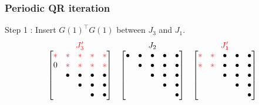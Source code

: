  \begin{frame}
   \frametitle{Periodic QR iteration}
   {\color{green} Step 1} : Insert $G(1)^\top G(1)$ between
   $J_3$ and $J_1$.
   \[
   \begin{matrix}
     {\color{red} J'_3} & J_2 &  {\color{red} J'_1} \\
     \begin{bmatrix}
       \ch & \ch & \ch & \ch & \ch \\
       0 & \ch & \ch & \ch & \ch \\
       & \uch & \uch & \uch & \uch \\
       & & \uch & \uch & \uch \\
       & & & \uch & \uch \\
     \end{bmatrix}
     &
     \begin{bmatrix}
       \uch & \uch & \uch & \uch & \uch \\
       & \uch & \uch & \uch & \uch \\
       & & \uch & \uch & \uch \\
       & & & \uch & \uch \\
       & & & & \uch \\
     \end{bmatrix}
     &
     \begin{bmatrix}
       \ch & \ch & \uch & \uch & \uch \\
       \ch & \ch & \uch & \uch & \uch \\
       & & \uch & \uch & \uch \\
       & & & \uch & \uch \\
       & & & & \uch \\
     \end{bmatrix}
   \end{matrix}
   \]
   

\end{frame}
